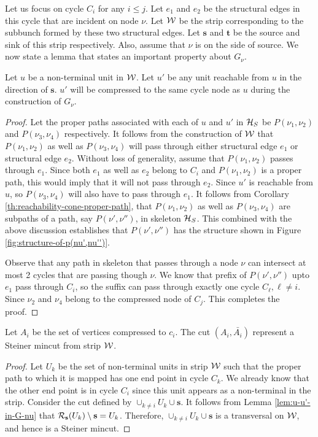 Let us focus on cycle $C_i$ for any $i\le j$. Let $e_1$ and $e_2$ be the structural edges in this cycle that are incident on node $\nu$. Let ${\cal W}$ be the strip corresponding to the subbunch formed by these two structural edges. Let $\mathbf s$ and $\mathbf t$ be the source and sink of this strip respectively. Also, assume that $\nu$ is on the side of source. We now state a lemma that states an important property about $G_\nu$.

\begin{lemma}
Let $u$ be a non-terminal unit in ${\cal W}$. Let $u'$ be any unit reachable from $u$ in the direction of ${\mathbf{s}}$. $u'$ will be compressed to the same cycle node as $u$ during the construction of $G_\nu$.
\label{lem:u-u'-in-G-nu}
\end{lemma}
\begin{proof}
Let the proper paths associated with each of $u$ and $u'$ in ${\cal H}_S$ be $P(\nu_1,\nu_2)$ and $P(\nu_3,\nu_4)$ respectively. 
It follows from the construction of ${\cal W}$ that
$P(\nu_1,\nu_2)$ as well as $P(\nu_3,\nu_4)$ will pass through either structural edge $e_1$ or structural edge $e_2$. Without loss of generality,  assume that $P(\nu_1,\nu_2)$ passes through $e_1$. Since both $e_1$ as well as $e_2$ belong to $C_i$ and $P(\nu_1,\nu_2)$ is a proper path, this would imply that it will not pass through $e_2$. Since $u'$ is reachable from $u$, so $P(\nu_3,\nu_4)$ will also have to pass through $e_1$.
It follows from Corollary \ref{th:reachability-cone-proper-path}, that 
$P(\nu_1,\nu_2)$ as well as $P(\nu_3,\nu_4)$ are subpaths of a path, say $P(\nu',\nu'')$, in skeleton
${\cal H}_S$. This combined with the above discussion establishes that $P(\nu',\nu'')$ has the structure shown in Figure \ref{fig:structure-of-p(nu',nu'')}.

Observe that any path in skeleton that passes through a node $\nu$ can intersect at most 2 cycles that are passing though $\nu$. We know that prefix of $P(\nu',\nu'')$ upto $e_1$ pass through $C_i$, so the suffix can pass through exactly one cycle $C_\ell, \ell \not=i$.
Since $\nu_2$ and $\nu_4$ belong to the compressed node of $C_j$. This completes the proof.
\end{proof}


\begin{lemma}
Let $A_i$ be the set of vertices compressed to $c_i$. The cut $(A_i,\bar{A_i})$ represent a Steiner mincut from strip ${\cal W}$.
\end{lemma}
\begin{proof}
Let $U_k$ be the set of non-terminal units in strip ${\cal W}$ such that the proper path to which it is mapped has one end point in cycle $C_k$. We already know that the other end point is in cycle $C_i$ since this unit appears as a non-terminal in the strip. Consider the cut defined by 
$\cup_{k\not=i} U_k \cup {\mathbf{s}}$.
It follows from Lemma \ref{lem:u-u'-in-G-nu} that 
${\cal R}_{\mathbf s}(U_k) \setminus {\mathbf s} = U_k$.
Therefore, $\cup_{k\not=i} U_k \cup {\mathbf{s}}$ is a transversal on ${\cal W}$, and hence is a Steiner mincut.
\end{proof}


